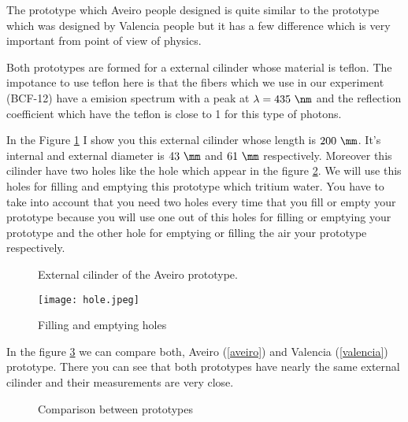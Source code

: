 The prototype which Aveiro people designed is quite similar to the prototype which was designed by Valencia people but it has a few difference which is very important from point of view of physics. 

Both prototypes are formed for a external cilinder whose material is teflon. The impotance to use teflon here is that the fibers which we use in our experiment (BCF-12) have a emision spectrum with a peak at $\lambda=435~\nm$ and the reflection coefficient which have the teflon is close to 1 for this type of photons. 

In the Figure \ref{externalcilinder} I show you this external cilinder whose length is $200~\mm$. It's internal and external diameter is $43~\mm$ and $61~\mm$ respectively. Moreover this cilinder have two holes like the hole which appear in the figure \ref{hole}. We will use this holes for filling and emptying this prototype which tritium water. You have to take into account that you need two holes every time that you fill or empty your prototype because you will use one out of this holes for filling or emptying your prototype and the other hole for emptying or filling the air your prototype respectively.

\begin{figure}[hbtp]
 \centering
 \caption{External cilinder of the Aveiro prototype. \label{externalcilinder}}
\end{figure}





\begin{figure}[hbtp]
\centering
\texttt{[image: hole.jpeg]}
\caption{Filling and emptying holes \label{hole}}
\end{figure}

In the figure \ref{comparison} we can compare both, Aveiro (\ref{aveiro}) and Valencia (\ref{valencia}) prototype. There you can see that both prototypes have nearly the same external cilinder and their measurements are very close.  

\begin{figure}[hbtp]
 \centering
 \caption{Comparison between prototypes \label{comparison}}
\end{figure}

